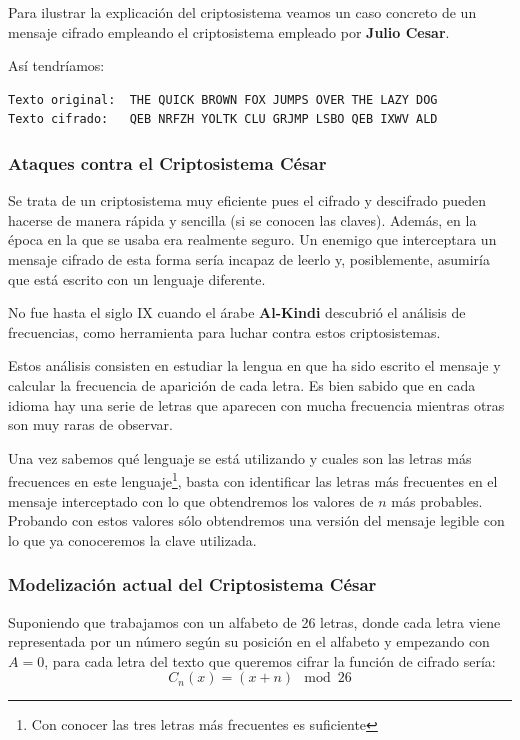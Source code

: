 \documentclass[nochap]{apuntesURJC}
\begin{document}
Para ilustrar la explicación del criptosistema veamos un caso concreto de un mensaje cifrado empleando el criptosistema empleado por \textbf{Julio Cesar}.

Así tendríamos:
\begin{verbatim}
Texto original:  THE QUICK BROWN FOX JUMPS OVER THE LAZY DOG
Texto cifrado:   QEB NRFZH YOLTK CLU GRJMP LSBO QEB IXWV ALD
\end{verbatim}

\subsubsection{Ataques contra el Criptosistema César}
Se trata de un criptosistema muy eficiente pues el cifrado y descifrado pueden hacerse de manera rápida y sencilla (si se conocen las claves). Además, en la época en la que se usaba era realmente seguro. Un enemigo que interceptara un mensaje cifrado de esta forma sería incapaz de leerlo y, posiblemente, asumiría que está escrito con un lenguaje diferente.

No fue hasta el siglo IX cuando el árabe \textbf{Al-Kindi} descubrió el análisis de frecuencias, como herramienta para luchar contra estos criptosistemas.

Estos análisis consisten en estudiar la lengua en que ha sido escrito el mensaje y calcular la frecuencia de aparición de cada letra. Es bien sabido que en cada idioma hay una serie de letras que aparecen con mucha frecuencia mientras otras son muy raras de observar.

Una vez sabemos qué lenguaje se está utilizando y cuales son las letras más frecuences en este lenguaje\footnote{Con conocer las tres letras más frecuentes es suficiente}, basta con identificar las letras más frecuentes en el mensaje interceptado con lo que obtendremos los valores de $n$ más probables. Probando con estos valores sólo obtendremos una versión del mensaje legible con lo que ya conoceremos la clave utilizada.

\subsubsection{Modelización actual del Criptosistema César}

Suponiendo que trabajamos con un alfabeto de 26 letras, donde cada letra viene representada por un número según su posición en el alfabeto y empezando con $A=0$, para cada letra del texto que queremos cifrar la función de cifrado sería:
\[C_n(x)=(x+n) \mod 26\]
\end{document}
